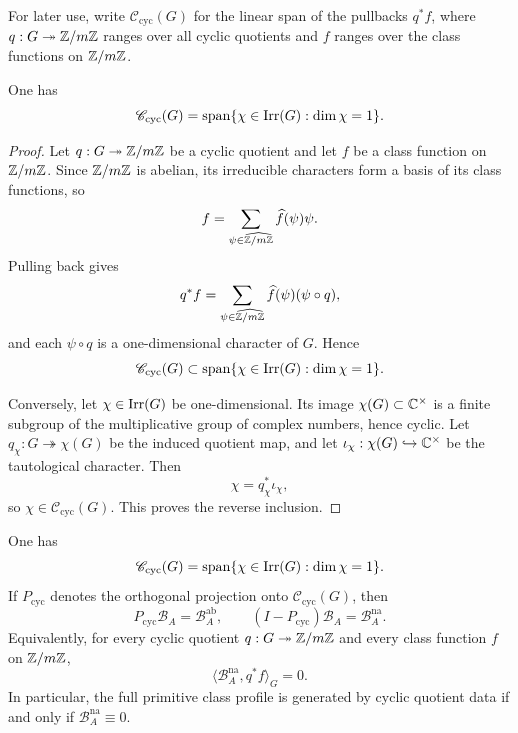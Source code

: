 For later use, write \(\mathscr C_{\mathrm{cyc}}(G)\) for the linear
span of the pullbacks \(q^\ast f\), where \(q:G\twoheadrightarrow \mathbb{Z}/m\mathbb{Z}\)
ranges over all cyclic quotients and \(f\) ranges over the class
functions on \(\mathbb{Z}/m\mathbb{Z}\).

\begin{lemma}
  \label{lem:cyclic-quotients-one-dimensional-characters}
  One has
  \[
    \mathscr C_{\mathrm{cyc}}(G)
    =
    \operatorname{span}\{\chi\in\operatorname{Irr}(G):\dim\chi=1\}.
  \]
\end{lemma}

\begin{proof}
  Let \(q:G\twoheadrightarrow \mathbb{Z}/m\mathbb{Z}\) be a cyclic quotient and let
  \(f\) be a class function on \(\mathbb{Z}/m\mathbb{Z}\). Since \(\mathbb{Z}/m\mathbb{Z}\) is
  abelian, its irreducible characters form a basis of its class
  functions, so
  \[
    f=\sum_{\psi\in\widehat{\mathbb{Z}/m\mathbb{Z}}}\widehat f(\psi)\psi.
  \]
  Pulling back gives
  \[
    q^\ast f
    =
    \sum_{\psi\in\widehat{\mathbb{Z}/m\mathbb{Z}}}
      \widehat f(\psi)(\psi\circ q),
  \]
  and each \(\psi\circ q\) is a one-dimensional character of \(G\).
  Hence
  \[
    \mathscr C_{\mathrm{cyc}}(G)
    \subset
    \operatorname{span}\{\chi\in\operatorname{Irr}(G):\dim\chi=1\}.
  \]

  Conversely, let \(\chi\in\operatorname{Irr}(G)\) be one-dimensional. Its image
  \(\chi(G)\subset\mathbb{C}^\times\) is a finite subgroup of the multiplicative
  group of complex numbers, hence cyclic. Let
  \(q_\chi:G\twoheadrightarrow \chi(G)\) be the induced quotient map,
  and let \(\iota_\chi:\chi(G)\hookrightarrow \mathbb{C}^\times\) be the
  tautological character. Then
  \[
    \chi=q_\chi^\ast\iota_\chi,
  \]
  so \(\chi\in\mathscr C_{\mathrm{cyc}}(G)\). This proves the reverse
  inclusion.
\end{proof}

\begin{proposition}
  \label{thm:cyclic-detection-boundary}
  One has
  \[
    \mathscr C_{\mathrm{cyc}}(G)
    =
    \operatorname{span}\{\chi\in\operatorname{Irr}(G):\dim\chi=1\}.
  \]
  If \(P_{\mathrm{cyc}}\) denotes the orthogonal projection onto
  \(\mathscr C_{\mathrm{cyc}}(G)\), then
  \[
    P_{\mathrm{cyc}}\mathcal B_A=\mathcal B_A^{\mathrm{ab}},
    \qquad
    (I-P_{\mathrm{cyc}})\mathcal B_A=\mathcal B_A^{\mathrm{na}}.
  \]
  Equivalently, for every cyclic quotient \(q:G\twoheadrightarrow \mathbb{Z}/m\mathbb{Z}\)
  and every class function \(f\) on \(\mathbb{Z}/m\mathbb{Z}\),
  \[
    \langle \mathcal B_A^{\mathrm{na}},q^\ast f\rangle_G=0.
  \]
  In particular, the full primitive class profile is generated by
  cyclic quotient data if and only if
  \(\mathcal B_A^{\mathrm{na}}\equiv 0\).
\end{proposition}

